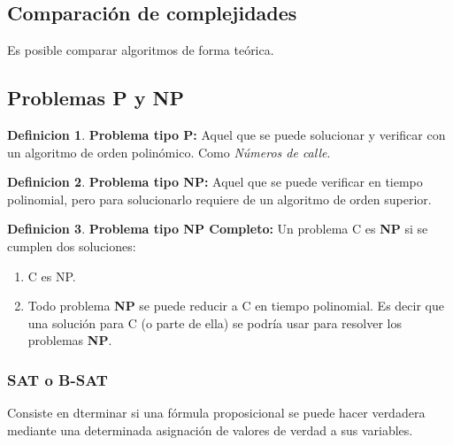 \documentclass{article}
\theoremstyle{definition}
\newtheorem{definition}{Definicion}
\begin{document}
\begin{flushleft}
\subsection{Comparación de complejidades}
Es posible comparar algoritmos de forma teórica. 

\subsection{Problemas P y NP}

\begin{definition}

  \textbf{Problema tipo P:} Aquel que se puede solucionar y verificar con un
  algoritmo de orden polinómico. Como \textit{Números de calle}.

\end{definition}

\begin{definition}

  \textbf{Problema tipo NP:} Aquel que se puede verificar en tiempo polinomial,
  pero para solucionarlo requiere de un algoritmo de orden superior. 

\end{definition}

\begin{definition}

  \textbf{Problema tipo NP Completo: } Un problema C es \textbf{NP} si se 
  cumplen dos soluciones:

  \begin{enumerate}

    \item C es NP.
    \item Todo problema \textbf{NP} se puede reducir a C en tiempo polinomial. 
      Es decir que una solución para C (o parte de ella) se podría usar para 
      resolver los problemas \textbf{NP}.

  \end{enumerate}

\end{definition}

\subsubsection{SAT o B-SAT}
Consiste en dterminar si una fórmula proposicional se puede hacer verdadera 
mediante una determinada asignación de valores de verdad a sus variables. 


\end{flushleft}
\end{document}
